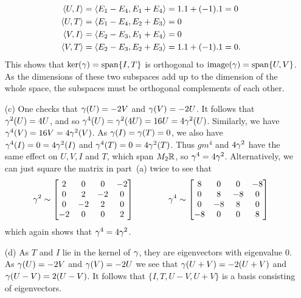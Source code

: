 \begin{itemize}
   \begin{align*}
    \langle U,I\rangle &= \langle E_1-E_4,E_1+E_4\rangle = 1.1 + (-1).1 = 0 \\
    \langle U,T\rangle &= \langle E_1-E_4,E_2+E_3\rangle = 0 \\
    \langle V,I\rangle &= \langle E_2-E_3,E_1+E_4\rangle = 0 \\
    \langle V,T\rangle &= \langle E_2-E_3,E_2+E_3\rangle = 1.1 + (-1).1 = 0.
   \end{align*}
   This shows that $\ker(\gamma)=\operatorname{span}\{I,T\}$ is orthogonal to
   $\operatorname{image}(\gamma)=\operatorname{span}\{U,V\}$.  As the dimensions of these two
   subspaces add up to the dimension of the whole space, the
   subspaces must be orthogonal complements of each other.
  \item[(c)] One checks that $\gamma(U)=-2V$ and $\gamma(V)=-2U$.  It
   follows that $\gamma^2(U)=4U$, and so
   $\gamma^4(U)=\gamma^2(4U)=16U=4\gamma^2(U)$.  Similarly, we have
   $\gamma^4(V)=16V=4\gamma^2(V)$.  As $\gamma(I)=\gamma(T)=0$, we also have
   $\gamma^4(I)=0=4\gamma^2(I)$ and $\gamma^4(T)=0=4\gamma^2(T)$.  Thus $gm^4$
   and $4\gamma^2$ have the same effect on $U,V,I$ and $T$, which span
   $M_2{\mathbb{R}}$, so $\gamma^4=4\gamma^2$.  Alternatively, we can just square
   the matrix in part~(a) twice to see that
   \[
    \gamma^2\sim
     \left[\begin{matrix} 2 &  0 &  0 & -2 \\
          0 &  2 & -2 &  0 \\
          0 & -2 &  2 &  0 \\
         -2 &  0 &  0 &  2 \end{matrix}\right]
    \hspace{4em}
    \gamma^4\sim
     \left[\begin{matrix} 8 &  0 &  0 & -8 \\
          0 &  8 & -8 &  0 \\
          0 & -8 &  8 &  0 \\
         -8 &  0 &  0 &  8 \end{matrix}\right]
   \]
   which again shows that $\gamma^4=4\gamma^2$.
  \item[(d)] As $T$ and $I$ lie in the kernel of $\gamma$, they are
  eigenvectors with eigenvalue $0$.  As $\gamma(U)=-2V$ and
  $\gamma(V)=-2U$ we see that $\gamma(U+V)=-2(U+V)$ and
  $\gamma(U-V)=2(U-V)$.  It follows that $\{I,T,U-V,U+V\}$ is a basis
  consisting of eigenvectors.
 \end{itemize}
\EndDeferredSolution
